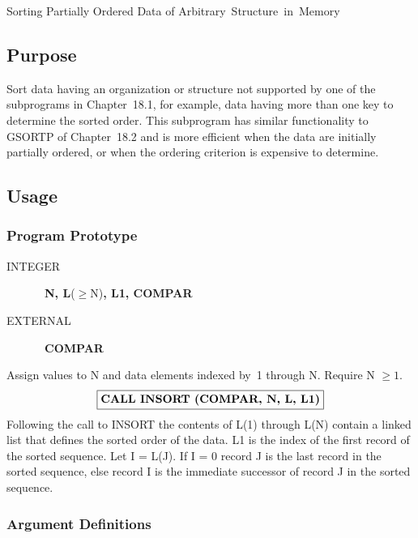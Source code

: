 \documentclass[twoside]{MATH77}
\begin{document}
 Sorting Partially Ordered Data of
\hbox{Arbitrary Structure in Memory}


\subsection{Purpose}

Sort data having an organization or structure not supported by one of the
subprograms in Chapter~18.1, for example, data having more than one key to
determine the sorted order. This subprogram has similar functionality
to GSORTP of Chapter~18.2 and is more efficient when the data are initially
partially ordered, or when the ordering criterion is expensive to
determine.

\subsection{Usage}

\subsubsection{Program Prototype}

\begin{description}
\item[INTEGER]  \ {\bf N, L}($\geq $N){\bf , L1, COMPAR}

\item[EXTERNAL]  \ {\bf COMPAR}
\end{description}

Assign values to N and data elements indexed by~1 through N. Require
N $\geq 1.$
$$
\fbox{{\bf CALL INSORT (COMPAR, N, L, L1)}}
$$
Following the call to INSORT the contents of L(1) through L(N) contain a
linked list that defines the sorted order of the data. L1 is the index of
the first record of the sorted sequence. Let I = L(J). If I = 0 record
J is the last record in the sorted sequence, else record I is the immediate
successor of record J in the sorted sequence.

\subsubsection{Argument Definitions}
\end{document}

